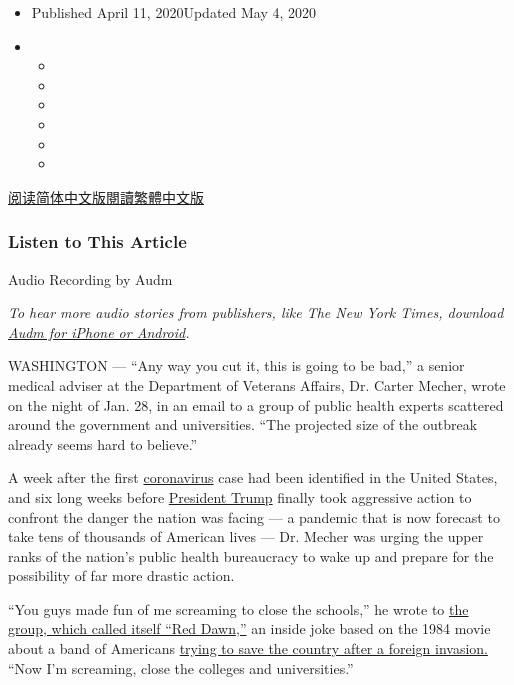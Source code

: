\begin{itemize}
\item
  Published April 11, 2020Updated May 4, 2020
\item
  \begin{itemize}
  \item
  \item
  \item
  \item
  \item
  \item
  \end{itemize}
\end{itemize}

\href{https://cn.nytimes.com/usa/20200413/coronavirus-trump-response/}{阅读简体中文版}\href{https://cn.nytimes.com/usa/20200413/coronavirus-trump-response/zh-hant/}{閱讀繁體中文版}

\hypertarget{listen-to-this-article}{%
\subsubsection{Listen to This Article}\label{listen-to-this-article}}

Audio Recording by Audm

\emph{To hear more audio stories from publishers, like The New York
Times, download}
\href{https://www.audm.com/?utm_source=nyt\&utm_medium=embed\&utm_campaign=trumps_failure_virus}{\emph{Audm
for iPhone or Android}}\emph{.}

WASHINGTON --- ``Any way you cut it, this is going to be bad,'' a senior
medical adviser at the Department of Veterans Affairs, Dr. Carter
Mecher, wrote on the night of Jan. 28, in an email to a group of public
health experts scattered around the government and universities. ``The
projected size of the outbreak already seems hard to believe.''

A week after the first
\href{https://www.nytimes.com/2020/05/04/us/politics/trump-coronavirus-death-toll.html}{coronavirus}
case had been identified in the United States, and six long weeks before
\href{https://www.nytimes.com/2020/05/04/us/politics/trump-coronavirus-death-toll.html}{President
Trump} finally took aggressive action to confront the danger the nation
was facing --- a pandemic that is now forecast to take tens of thousands
of American lives --- Dr. Mecher was urging the upper ranks of the
nation's public health bureaucracy to wake up and prepare for the
possibility of far more drastic action.

``You guys made fun of me screaming to close the schools,'' he wrote to
\href{https://int.nyt.com/data/documenthelper/6879-2020-covid-19-red-dawn-rising/66f590d5cd41e11bea0f/optimized/full.pdf\#page=1}{the
group, which called itself ``Red Dawn,''} an inside joke based on the
1984 movie about a band of Americans
\href{https://www.youtube.com/watch?v=mRTzUHmx9ZA}{trying to save the
country after a foreign invasion.} ``Now I'm screaming, close the
colleges and universities.''

